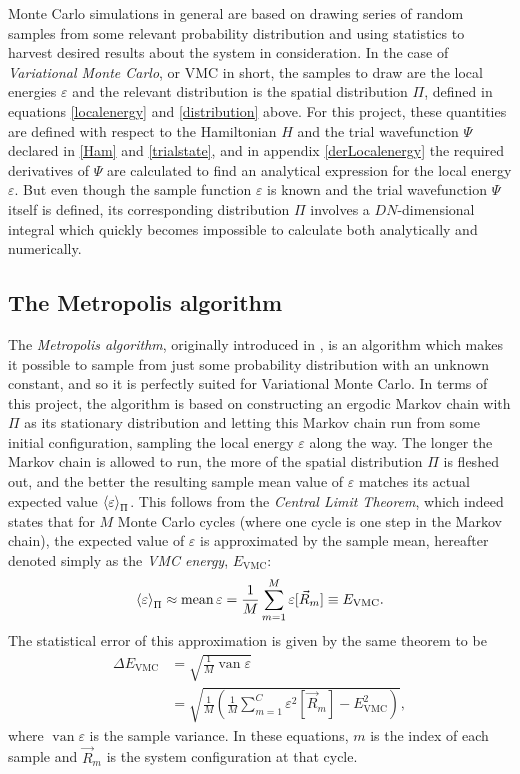 \documentclass[a4paper,8pt]{article}
\DeclareMathOperator{\mean}{mean}
\DeclareMathOperator{\van}{van}
\begin{document}
\begin{multicols}{2}
Monte Carlo simulations in general are based on drawing series of random samples from some relevant probability distribution and using statistics to harvest desired results about the system in consideration. In the case of \textit{Variational Monte Carlo}, or VMC in short, the samples to draw are the local energies $\varepsilon$ and the relevant distribution is the spatial distribution $\Pi$, defined in equations \eqref{localenergy} and \eqref{distribution} above. For this project, these quantities are defined with respect to the Hamiltonian $H$ and the trial wavefunction $\Psi$ declared in \eqref{Ham} and \eqref{trialstate}, and in appendix \ref{derLocalenergy} the required derivatives of $\Psi$ are calculated to find an analytical expression for the local energy $\varepsilon$. But even though the sample function $\varepsilon$ is known and the trial wavefunction $\Psi$ itself is defined, its corresponding distribution $\Pi$ involves a $DN$-dimensional integral which quickly becomes impossible to calculate both analytically and numerically.


\subsection{The Metropolis algorithm}\label{Metropolis}
The \textit{Metropolis algorithm}, originally introduced in \cite{MRRTT}, is an algorithm which makes it possible to sample from just some probability distribution with an unknown constant, and so it is perfectly suited for Variational Monte Carlo. In terms of this project, the algorithm is based on constructing an ergodic Markov chain with $\Pi$ as its stationary distribution and letting this Markov chain run from some initial configuration, sampling the local energy $\varepsilon$ along the way. The longer the Markov chain is allowed to run, the more of the spatial distribution $\Pi$ is fleshed out, and the better the resulting sample mean value of $\varepsilon$ matches its actual expected value $\ev{\varepsilon}_\Pi$. This follows from the \textit{Central Limit Theorem}, which indeed states that for $M$ Monte Carlo cycles (where one cycle is one step in the Markov chain), the expected value of $\varepsilon$ is approximated by the sample mean, hereafter denoted simply as the \textit{VMC energy}, $E_\text{VMC}$:
\begin{equation}\label{estimate}
\ev{\varepsilon}_\Pi \approx \mean\varepsilon = \frac{1}{M}\sum\limits_{m = 1}^M \varepsilon[\vec{R}_m] \equiv E_\text{VMC}.
\end{equation}
The statistical error of this approximation is given by the same theorem to be
\begin{align}
\Delta E_\text{VMC} &= \sqrt{\frac{1}{M} \van\varepsilon} \nonumber\\
&= \sqrt{\frac{1}{M}\left(\frac{1}{M}\sum\limits_{m = 1}^C \varepsilon^2[\vec{R}_m] - E^2_\text{VMC}\right)}, \label{error}
\end{align}
where $\van\varepsilon$ is the sample variance. In these equations, $m$ is the index of each sample and $\vec{R}_m$ is the system configuration at that cycle.


\end{multicols}
\end{document}
